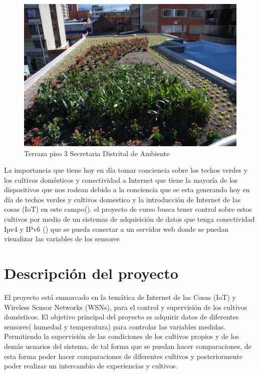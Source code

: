 \documentclass[10pt]{article}\usepackage[]{graphicx}\usepackage[]{color}
\begin{document}
	\begin{figure}[ht] %
		\centering
		\includegraphics[scale=2.5]{techoverde}   %
		\caption{Terraza piso 3 Secretaria Distrital de Ambiente}
		
	\end{figure}
	
	La importancia que tiene hoy en día tomar conciencia sobre los techos verdes y los cultivos domésticos y conectividad a Internet que tiene la mayoría de los dispositivos que nos rodean debido a la conciencia que se esta generando hoy en día de techos verdes y cultivos domestico y la introducción  de Internet de las cosas (IoT) en este campo(\cite{cultivo}). el proyecto de curso busca tener control sobre estos cultivos por medio de un sistemas de adquisición de datos que tenga conectividad Ipv4 y IPv6 (\cite{ipv6}) que se pueda conectar a un  servidor web donde se puedan visualizar las variables de los sensores
	
	
	
	
	\section{Descripción del proyecto}
	
	El proyecto está enmarcado en la temática de Internet de las Cosas (IoT) y  Wireless Sensor Networks (WSNs), para el control y supervisión  de los cultivos domésticos. El objetivo principal del proyecto es adquirir datos de diferentes sensores( humedad y temperatura) para controlar las variables medidas. Permitiendo la supervisión de las condiciones de los cultivos propios y de los demás usuarios del sistema, de tal forma que se puedan hacer comparaciones, de esta forma poder hacer comparaciones de diferentes cultivos y posteriormente poder realizar un intercambio de experiencias y  cultivos. \\
	
\end{document}
